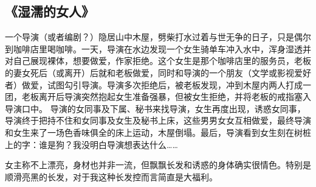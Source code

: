 \subsection{《湿濡的女人》}
一个导演（或者编剧？）隐居山中木屋，劈柴打水过着与世无争的日子，只是偶尔到咖啡店里喝咖啡。一天，导演在水边发现一个女生骑单车冲入水中，浑身湿透并对自己展现裸体，想要做爱，作家拒绝。这个女生是那个咖啡店里的服务员，老板的妻女死后（或离开）后就和老板做爱，同时和导演的一个朋友（文学或影视爱好者）做爱，试图勾引导演。导演多次拒绝后，被老板发现，冲到木屋内两人打成一团，老板离开后导演突然抱起女生准备强暴，但被女生拒绝，并将老板的戒指塞入导演口中。 导演的女同事及下属、秘书来找导演，女生再度出现，诱惑女同事，导演终于把持不住和女同事及女生及秘书上床，这些男男女女互相做爱，最终导演和女生来了一场色香味俱全的床上运动，木屋倒塌。最后，导演看到女生刻在树桩上的字：谁是狗？我没明白导演想表达什么……

女主称不上漂亮，身材也并非一流，但飘飘长发和诱惑的身体确实很情色。特别是顺滑亮黑的长发，对于我这种长发控而言简直是大福利。